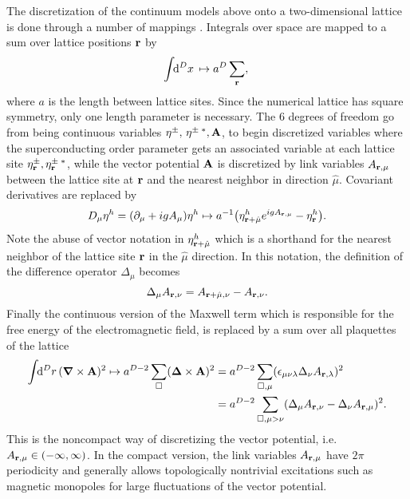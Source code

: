 The discretization of the continuum models above onto a two-dimensional lattice is done through a number of mappings \cite{troels14,peder16,shimizu12}. Integrals over space are mapped to a sum over lattice positions ${\boldsymbol{\mathbf{r}}}$ by
\begin{equation}
  \int\!\!\mathrm{d}^Dx\, \mapsto a^D\sum_{\boldsymbol{\mathbf{r}}},\\
  \label{eq:disc:map:int}
\end{equation}
where $a$ is the length between lattice sites. Since the numerical lattice has square symmetry, only one length parameter is necessary. The $6$ degrees of freedom go from being continuous variables
$\eta^\pm,\,\eta^{\pm\;\ast}, {\boldsymbol{\mathbf{A}}}$, to begin discretized variables where the superconducting order parameter gets an associated variable at each lattice site $\eta^\pm_{{\boldsymbol{\mathbf{r}}}}, \eta^{\pm\;\ast}_{\boldsymbol{\mathbf{r}}}$,
while the vector potential ${\boldsymbol{\mathbf{A}}}$ is discretized by link variables $A_{{\boldsymbol{\mathbf{r}}},\mu}$ between the lattice site at ${\boldsymbol{\mathbf{r}}}$ and the nearest neighbor in direction $\hat{\mu}$. Covariant derivatives are replaced by
\begin{equation}
  D_\mu\eta^h = (\partial_\mu + igA_\mu)\eta^h \mapsto a^{-1}\big(\eta^h_{{\boldsymbol{\mathbf{r}}}+\hat{\mu}}e^{igA_{{\boldsymbol{\mathbf{r}}},\mu}}-\eta^h_{\boldsymbol{\mathbf{r}}}\big).
  \label{eq:disc:map:covarDer}
\end{equation}
Note the abuse of vector notation in $\eta^h_{{\boldsymbol{\mathbf{r}}}+\hat{\mu}}$ which is a shorthand for the nearest neighbor of the lattice site ${\boldsymbol{\mathbf{r}}}$ in the $\hat{\mu}$ direction. In this notation, the definition
of the difference operator $\Delta_\mu$ becomes
\begin{equation}
  \Delta_\mu A_{{\boldsymbol{\mathbf{r}}},\nu} = A_{{\boldsymbol{\mathbf{r}}}+\hat{\mu},\nu} - A_{{\boldsymbol{\mathbf{r}}},\nu}.
  \label{eq:disc:difference}
\end{equation}
Finally the continuous version of the Maxwell term which is responsible for the free energy of the electromagnetic field, is replaced by a sum over all plaquettes of the lattice
\begin{equation}
  \begin{split}
	\int\!\!\mathrm{d}^Dr\,({\boldsymbol{\mathbf{\nabla}}}\times{\ensuremath{\boldsymbol{\mathbf{A}}}})^2 \mapsto a^{D-2}\sum_\Box({\boldsymbol{\mathbf{\Delta}}}\times{\ensuremath{\boldsymbol{\mathbf{A}}}})^2 &= a^{D-2}\sum_{\Box,\mu}(\epsilon_{\mu\nu\lambda}\Delta_\nu A_{{\boldsymbol{\mathbf{r}}},\lambda})^2 \\
  &= a^{D-2}\sum_{\Box,\mu>\nu}(\Delta_\mu A_{{\boldsymbol{\mathbf{r}}},\nu} - \Delta_\nu A_{{\boldsymbol{\mathbf{r}}},\mu})^2.
  \end{split}
  \label{eq:disc:Maxwell:noncompact}
\end{equation}
This is the noncompact way of discretizing the vector potential, i.e. $A_{{\boldsymbol{\mathbf{r}}},\mu}\in(-\infty,\infty)$. In the compact version, the link variables $A_{{\boldsymbol{\mathbf{r}}},\mu}$ have $2\pi$ periodicity and generally
allows topologically nontrivial excitations such as magnetic monopoles \cite{shimizu12} for large fluctuations of the vector potential.

